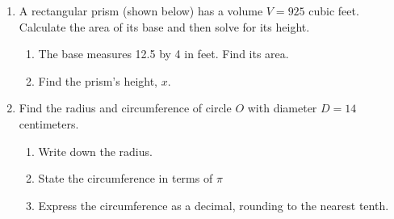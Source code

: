 \documentclass[12pt, twoside]{article}
\begin{document}
\begin{enumerate}
\newpage
\item A rectangular prism (shown below) has a volume $V=925$ cubic feet. Calculate the area of its base and then solve for its height.
\begin{multicols}{2}
\begin{enumerate}
  \item The base measures 12.5 by 4 in feet. Find its area.
  \item Find the prism's height, $x$. \vspace{2cm}
\end{enumerate}
  \begin{flushright}
  \end{flushright}
\end{multicols}

\newpage
\item Find the radius and circumference of circle $O$ with diameter $D=14$ centimeters.
  \begin{multicols}{2}
  \raggedcolumns
  \begin{enumerate}
    \item Write down the radius. \vspace{1.2cm}
    \item State the circumference in terms of $\pi$ \vspace{1cm}
    \item Express the circumference as a decimal, rounding to the nearest tenth.
  \end{enumerate}
  \columnbreak
  \end{multicols}


\end{enumerate}
\end{document}

